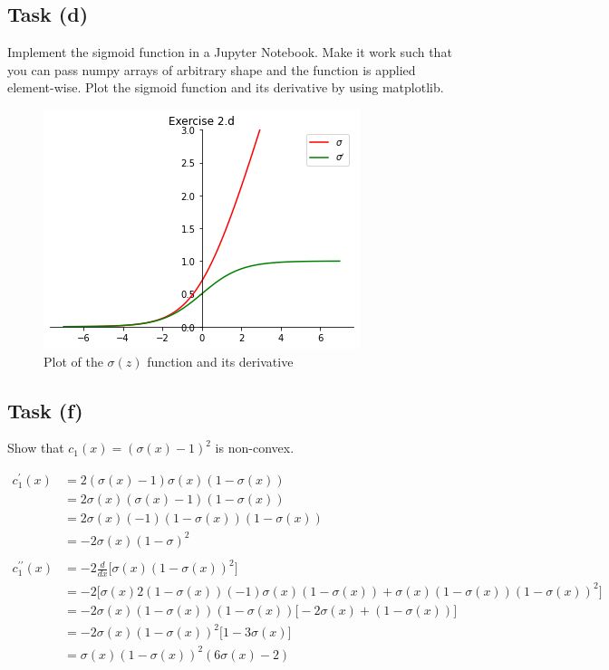 \documentclass[onecolumn]{article}
\begin{document}
\subsection{Task (d)}
Implement the sigmoid function in a Jupyter Notebook. Make it work such that you can
pass numpy arrays of arbitrary shape and the function is applied element-wise. Plot the
sigmoid function and its derivative by using matplotlib. 

\begin{figure}[tbh]
	\centering
	\includegraphics[width=.5\linewidth]{fig/exercise_2d.png}
	\caption{Plot of the $\sigma(z)$ function and its derivative}
\end{figure}

\subsection{Task (f)}
Show that $c_1(x) = (\sigma(x) -1)^2$ is non-convex.

\begin{align*}
	c_1^{\prime}(x) &= 2(\sigma(x)-1)\sigma(x)(1-\sigma(x)) && \\
	&= 2\sigma(x)(\sigma(x)-1)(1-\sigma(x)) && \\
	&= 2\sigma(x)(-1)(1-\sigma(x))(1-\sigma(x)) && \\
	&= -2\sigma(x)(1-\sigma)^2 && \\
	\\
	c_1^{\prime\prime}(x) &= -2\frac{d}{dx}\Big[\sigma(x)(1-\sigma(x))^2\Big] && \\
	&= -2\Big[\sigma(x)2(1-\sigma(x))(-1)\sigma(x)(1-\sigma(x)) + \sigma(x)(1-\sigma(x))(1-\sigma(x))^2\Big] && \\
	&= -2\sigma(x)(1-\sigma(x))(1-\sigma(x))\Big[-2\sigma(x) +(1-\sigma(x))\Big] && \\
	&= -2\sigma(x)(1-\sigma(x))^2\Big[1-3\sigma(x)\Big] && \\
	&= \sigma(x)(1-\sigma(x))^2(6\sigma(x) - 2) && \\
\end{align*}
\end{document}
